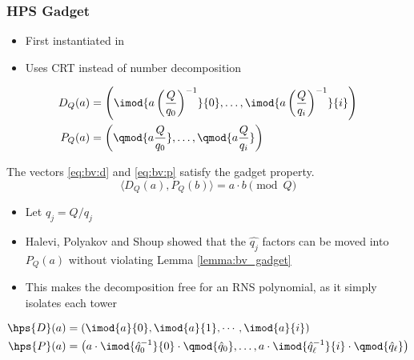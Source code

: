 \subsubsection{HPS Gadget}
\begin{itemize}
    \item First instantiated in \cite{cryptoeprint:2016/510}
    \item Uses CRT instead of number decomposition
\end{itemize}

\begin{align}
    \label{eq:bv:d}
    D_{Q}({a}) &= \left(\imod{a\left(\frac{Q}{q_0}\right)^{-1}}{0},\dots,\imod{a\left(\frac{Q}{q_i}\right)^{-1}}{i}\right) \\
    \label{eq:bv:p}
    P_{Q}({a}) &= \left(\qmod{a\frac{Q}{q_0}},\dots,\qmod{a\frac{Q}{q_i}}\right) 
\end{align}

\begin{lemma}
    \label{lemma:bv_gadget}
    The vectors \eqref{eq:bv:d} and \eqref{eq:bv:p} satisfy the gadget property.
    \begin{equation}
        \langle D_Q(a), P_Q(b)\rangle = a\cdot b \pmod{Q}
    \end{equation}
\end{lemma}

\begin{itemize}
    \item Let $\hat{q}_j = Q/q_j$
    \item Halevi, Polyakov and Shoup \cite{cryptoeprint:2018/117} showed that the $\hat{q_j}$ factors can be moved into $P_Q(a)$ without violating Lemma \ref{lemma:bv_gadget}
    \item This makes the decomposition free for an RNS polynomial, as it simply isolates each tower
\end{itemize}

\begin{align}
    \hps{D}(a) &= \left( \imod{a}{0}, \imod{a}{1}, \cdots, \imod{a}{i}\right)\\
    \hps{P}(a) &= \left( a\cdot\imod{\hat{q}_0^{-1}}{0} \cdot \qmod{\hat{q}_0}, \dots, a\cdot\imod{\hat{q}_\ell^{-1}}{i} \cdot \qmod{\hat{q}_\ell} \right)
\end{align}


